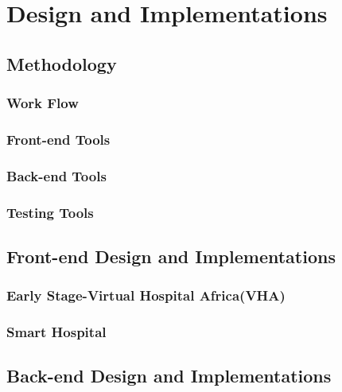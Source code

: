%
%
\chapter{Design and Implementations}
\label{chap:D&I}

\section{Methodology}
\label{sec:sec01}

\subsection{Work Flow}
\label{subsec:subsec01}

\subsection{Front-end Tools}
\label{subsec:FETools}


\subsection{Back-end Tools}
\label{subsec:subsec04}

\subsection{Testing Tools}
\label{subsec:subsec05}

\section{Front-end Design and Implementations}
\label{sec:sec02}

\subsection{Early Stage-Virtual Hospital Africa(VHA)}
\label{subsec:subsec01}



\subsection{Smart Hospital}
\label{subsec:subsec02}


\section{Back-end Design and Implementations}
\label{sec:sec03}

